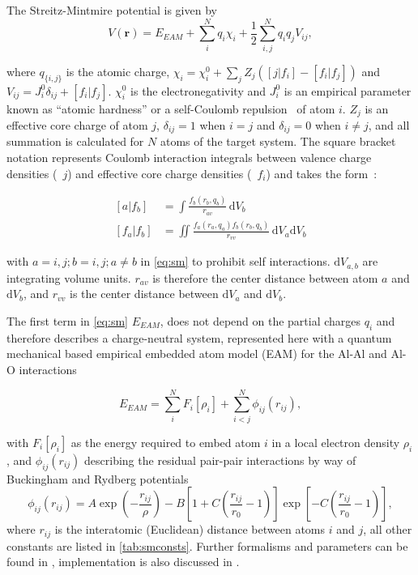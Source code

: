 The Streitz-Mintmire potential is given by
\begin{equation}
\label{eq:sm}
V(\mathbf{r}) = E_{EAM}+\sum_{i}^{N}q_i\chi_i + \frac{1}{2}\sum_{i,j}^{N}q_{i}q_{j}V_{ij},
\end{equation}

where $q_{\{i,j\}}$ is the atomic charge, $\chi_i = \chi_i^0 + \sum_{j}Z_{j}(\left[j|f_i\right]-\left[f_i|f_j\right])$ and $V_{ij} = J_{i}^{0}\delta_{ij}+\left[f_i|f_j\right]$.
$\chi_i^0$ is the electronegativity and $J_i^0$ is an empirical parameter known as ``atomic hardness'' or a self-Coulomb repulsion~\cite{Rappe1991} of atom $i$.
$Z_j$ is an effective core charge of atom $j$, $\delta_{ij} = 1$ when $i=j$ and $\delta_{ij} = 0$ when $i\neq j$, and all summation is calculated for $N$ atoms of the target system.
The square bracket notation represents Coulomb interaction integrals between valence charge densities (\eg\ $j$) and effective core charge densities (\eg\ $f_i$) and takes the form~\cite{Zhou2004}:

\begin{align}
\left[a|f_b\right] &= \int \frac{f_b(r_b,q_b)}{r_{av}}\,\mathrm{d}V_b\\
\left[f_a|f_b\right] &= \iint \frac{f_a(r_a,q_a)f_b(r_b,q_b)}{r_{vv}}\,\mathrm{d}V_a \mathrm{d}V_b
\end{align}

with $a=i,j; b=i,j; a\neq b$ in \cref{eq:sm} to prohibit self interactions.
$\mathrm{d}V_{a,b}$ are integrating volume units.
$r_{av}$ is therefore the center distance between atom $a$ and $\mathrm{d}V_b$, and $r_{vv}$ is the center distance between $\mathrm{d}V_a$ and $\mathrm{d}V_b$.

The first term in \cref{eq:sm} $E_{EAM}$, does not depend on the partial charges $q_i$ and therefore describes a charge-neutral system, represented here with a quantum mechanical based empirical embedded atom model (EAM) for the Al-Al and Al-O interactions

\begin{equation}
E_{EAM} = \sum_{i}^{N}F_{i}\left[\rho_i\right]+\sum_{i<j}^{N}\phi_{ij}(r_{ij}),
\end{equation}

with $F_{i}\left[\rho_i\right]$ as the energy required to embed atom $i$ in a local electron density $\rho_i$, and $\phi_{ij}(r_{ij})$ describing the residual pair-pair interactions by way of Buckingham and Rydberg potentials
\begin{equation}
\label{eq:smpair}
\phi_{ij}(r_{ij}) = A\exp\left(-\frac{r_{ij}}{\rho}\right)-B\left[1+C\left(\frac{r_{ij}}{r_0}-1\right)\right]\exp\left[-C\left(\frac{r_{ij}}{r_0}-1\right)\right],
\end{equation}
where $r_{ij}$ is the interatomic (Euclidean) distance between atoms $i$ and $j$, all other constants are listed in \cref{tab:smconsts}.
Further formalisms and parameters can be found in \cite{Streitz1994,Zhou2004}, implementation is also discussed in \cite{Gale2003}.

